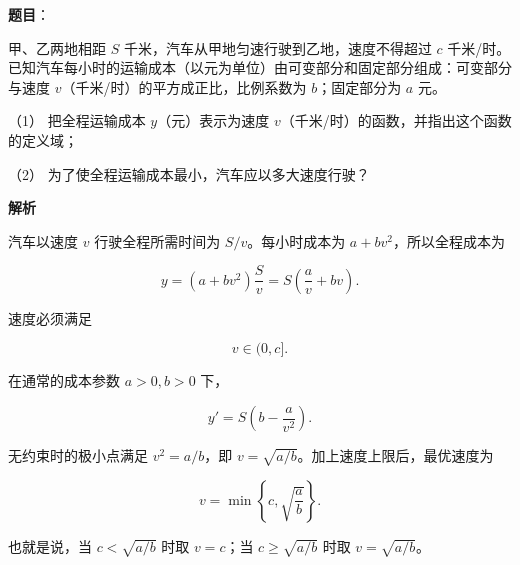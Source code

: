 \begin{answer}

\textbf{题目}：

甲、乙两地相距 $S$ 千米，汽车从甲地匀速行驶到乙地，速度不得超过 $c$ 千米/时。已知汽车每小时的运输成本（以元为单位）由可变部分和固定部分组成：可变部分与速度 $v$（千米/时）的平方成正比，比例系数为 $b$；固定部分为 $a$ 元。

（1） 把全程运输成本 $y$（元）表示为速度 $v$（千米/时）的函数，并指出这个函数的定义域；

（2） 为了使全程运输成本最小，汽车应以多大速度行驶？

\textbf{解析}


汽车以速度 $v$ 行驶全程所需时间为 $S/v$。每小时成本为 $a+bv^2$，所以全程成本为

\nopagebreak[4]
\[
y=(a+bv^2)\frac Sv=S\left(\frac av+bv\right).
\]

速度必须满足

\nopagebreak[4]
\[
v\in(0,c].
\]


在通常的成本参数 $a>0,b>0$ 下，

\nopagebreak[4]
\[
y'=S\left(b-\frac a{v^2}\right).
\]

无约束时的极小点满足 $v^2=a/b$，即 $v=\sqrt{a/b}$。加上速度上限后，最优速度为

\nopagebreak[4]
\[
v=\min\left\{c,\sqrt{\frac ab}\right\}.
\]

也就是说，当 $c<\sqrt{a/b}$ 时取 $v=c$；当 $c\geqslant\sqrt{a/b}$ 时取 $v=\sqrt{a/b}$。

\gkanswer{答案（1）：$y=S\left(\dfrac av+bv\right)\text{，}\quad v\in(0,c]$}


\end{answer}
